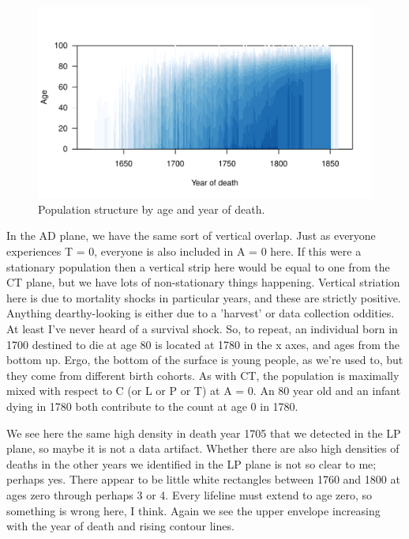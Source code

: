 \begin{figure}
\includegraphics[scale=.9]{Figures/QuebecAD.pdf}
\caption{Population structure by age and year of death.}
\label{fig:adq}
\end{figure}
In the AD plane, we have the same sort of vertical overlap. Just as everyone experiences T = 0, everyone is also included in A = 0 here. If this were a stationary population then a vertical strip here would be equal to one from the CT plane, but we have lots of non-stationary things happening. Vertical striation here is due to mortality shocks in particular years, and these are strictly positive. Anything dearthy-looking is either due to a 'harvest' or data collection oddities. At least I've never heard of a survival shock. So, to repeat, an individual born in 1700 destined to die at age 80 is located at 1780 in the x axes, and ages from the bottom up. Ergo, the bottom of the surface is young people, as we're used to, but they come from different birth cohorts. As with CT, the population is maximally mixed with respect to C (or L or P or T) at A = 0. An 80 year old and an infant dying in 1780 both contribute to the count at age 0 in 1780.

We see here the same high density in death year 1705 that we detected in the LP plane, so maybe it is not a data artifact. Whether there are also high densities of deaths in the other years we identified in the LP plane is not so clear to me; perhaps yes. There appear to be little white rectangles between 1760 and 1800 at ages zero through perhaps 3 or 4. Every lifeline must extend to age zero, so something is wrong here, I think. Again we see the upper envelope increasing with the year of death and rising contour lines.

